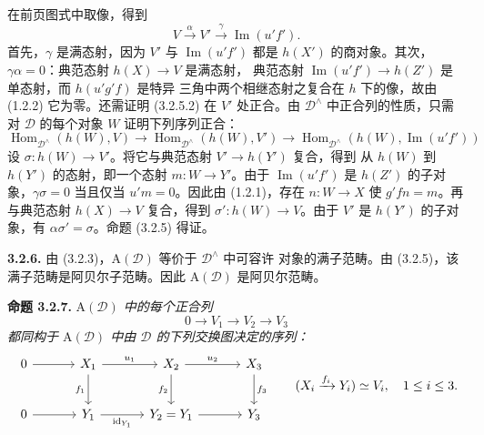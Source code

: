 \clearpage
{}%
\begingroup\small\setlength{\parskip}{0pt}\setlength{\emergencystretch}{1.5em}
在前页图式中取像，得到
\[
V\xrightarrow{\alpha}V'\xrightarrow{\gamma}\operatorname{Im}(u'f').
\tag{3.2.5.2}
\]
首先，$\gamma$ 是满态射，因为 $V'$ 与 $\operatorname{Im}(u'f')$ 都是
$h(X')$ 的商对象。其次，$\gamma\alpha=0$：典范态射 $h(X)\to V$ 是满态射，
典范态射 $\operatorname{Im}(u'f')\to h(Z')$ 是单态射，而 $h(u'g'f)$ 是特异
三角中两个相继态射之复合在 $h$ 下的像，故由 (1.2.2) 它为零。还需证明
(3.2.5.2) 在 $V'$ 处正合。由 $\mathcal D^\wedge$ 中正合列的性质，只需对
$\mathcal D$ 的每个对象 $W$ 证明下列序列正合：
\[
\operatorname{Hom}_{\mathcal D^\wedge}(h(W),V)\longrightarrow
\operatorname{Hom}_{\mathcal D^\wedge}(h(W),V')\longrightarrow
\operatorname{Hom}_{\mathcal D^\wedge}(h(W),\operatorname{Im}(u'f'))
\]
设 $\sigma\colon h(W)\to V'$。将它与典范态射 $V'\to h(Y')$ 复合，得到
从 $h(W)$ 到 $h(Y')$ 的态射，即一个态射 $m\colon W\to Y'$。由于
$\operatorname{Im}(u'f')$ 是 $h(Z')$ 的子对象，$\gamma\sigma=0$ 当且仅当
$u'm=0$。因此由 (1.2.1)，存在 $n\colon W\to X$ 使 $g'fn=m$。再与典范态射
$h(X)\to V$ 复合，得到 $\sigma'\colon h(W)\to V$。由于 $V'$ 是 $h(Y')$
的子对象，有 $\alpha\sigma'=\sigma$。命题 (3.2.5) 得证。

\medskip\noindent\textbf{3.2.6.}\quad
由 (3.2.3)，$\mathrm A(\mathcal D)$ 等价于 $\mathcal D^\wedge$ 中可容许
对象的满子范畴。由 (3.2.5)，该满子范畴是阿贝尔子范畴。因此
$\mathrm A(\mathcal D)$ 是阿贝尔范畴。

\medskip\noindent\textbf{命题 3.2.7.}\quad
\textit{$\mathrm A(\mathcal D)$ 中的每个正合列}
\[
0\longrightarrow V_1\longrightarrow V_2\longrightarrow V_3
\]
\textit{都同构于 $\mathrm A(\mathcal D)$ 中由 $\mathcal D$ 的下列交换图决定的序列：}
\[
\begin{tikzcd}[column sep=3.3em,row sep=2.4em]
0\arrow[r]&X_1\arrow[r,"u_1"]\arrow[d,"f_1"']&X_2\arrow[r,"u_2"]\arrow[d,"f_2"']&X_3\arrow[d,"f_3"]\\
0\arrow[r]&Y_1\arrow[r,"\operatorname{id}_{Y_1}"']&Y_2=Y_1\arrow[r]&Y_3
\end{tikzcd}
\qquad
(X_i\xrightarrow{f_i}Y_i)\simeq V_i,\quad1\leq i\leq3.
\]
\endgroup
